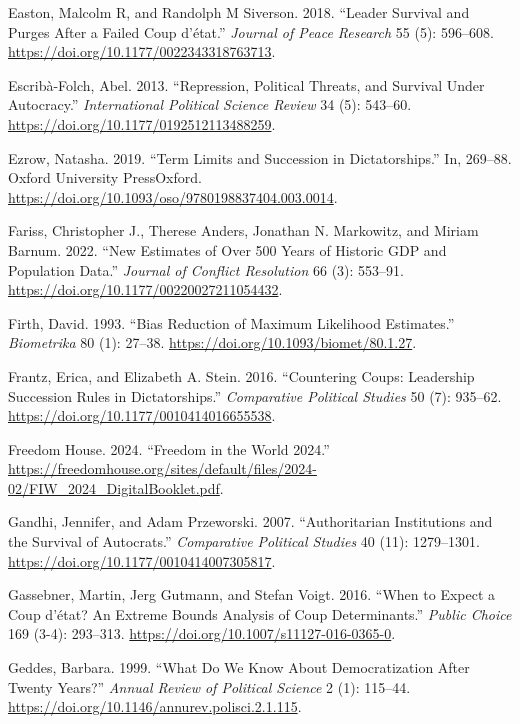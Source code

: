 \documentclass[
  12pt,
]{report}
\newlength{\cslhangindent}
\newenvironment{CSLReferences}[2] %
 {\begin{list}{}{%
  \setlength{\itemindent}{0pt}
  \setlength{\leftmargin}{0pt}
  \setlength{\parsep}{0pt}
  \ifodd #1
   \setlength{\leftmargin}{\cslhangindent}
   \setlength{\itemindent}{-1\cslhangindent}
  \fi
  \setlength{\itemsep}{#2\baselineskip}}}
 {\end{list}}
\begin{document}
\begin{CSLReferences}{1}{0}
Easton, Malcolm R, and Randolph M Siverson. 2018. {``Leader Survival and
Purges After a Failed Coup d{'}état.''} \emph{Journal of Peace Research}
55 (5): 596--608. \url{https://doi.org/10.1177/0022343318763713}.

Escribà-Folch, Abel. 2013. {``Repression, Political Threats, and
Survival Under Autocracy.''} \emph{International Political Science
Review} 34 (5): 543--60. \url{https://doi.org/10.1177/0192512113488259}.

Ezrow, Natasha. 2019. {``Term Limits and Succession in Dictatorships.''}
In, 269--88. Oxford University PressOxford.
\url{https://doi.org/10.1093/oso/9780198837404.003.0014}.

Fariss, Christopher J., Therese Anders, Jonathan N. Markowitz, and
Miriam Barnum. 2022. {``New Estimates of Over 500 Years of Historic GDP
and Population Data.''} \emph{Journal of Conflict Resolution} 66 (3):
553--91. \url{https://doi.org/10.1177/00220027211054432}.

Firth, David. 1993. {``Bias Reduction of Maximum Likelihood
Estimates.''} \emph{Biometrika} 80 (1): 27--38.
\url{https://doi.org/10.1093/biomet/80.1.27}.

Frantz, Erica, and Elizabeth A. Stein. 2016. {``Countering Coups:
Leadership Succession Rules in Dictatorships.''} \emph{Comparative
Political Studies} 50 (7): 935--62.
\url{https://doi.org/10.1177/0010414016655538}.

Freedom House. 2024. {``Freedom in the World 2024.''}
\url{https://freedomhouse.org/sites/default/files/2024-02/FIW_2024_DigitalBooklet.pdf}.

Gandhi, Jennifer, and Adam Przeworski. 2007. {``Authoritarian
Institutions and the Survival of Autocrats.''} \emph{Comparative
Political Studies} 40 (11): 1279--1301.
\url{https://doi.org/10.1177/0010414007305817}.

Gassebner, Martin, Jerg Gutmann, and Stefan Voigt. 2016. {``When to
Expect a Coup d{'}état? An Extreme Bounds Analysis of Coup
Determinants.''} \emph{Public Choice} 169 (3-4): 293--313.
\url{https://doi.org/10.1007/s11127-016-0365-0}.

Geddes, Barbara. 1999. {``What Do We Know About Democratization After
Twenty Years?''} \emph{Annual Review of Political Science} 2 (1):
115--44. \url{https://doi.org/10.1146/annurev.polisci.2.1.115}.


\end{CSLReferences}
\end{document}
